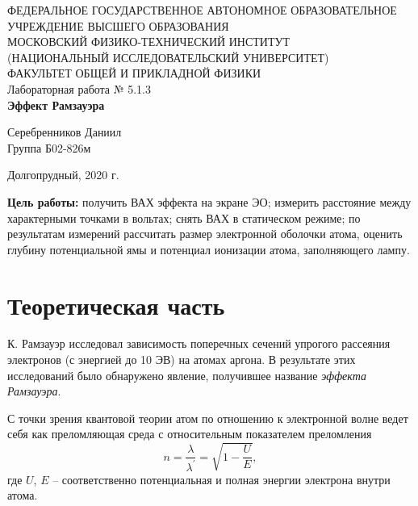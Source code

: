 \documentclass[a4paper,12pt]{article} %
\begin{document}
\begin{center}
	\footnotesize{ФЕДЕРАЛЬНОЕ ГОСУДАРСТВЕННОЕ АВТОНОМНОЕ ОБРАЗОВАТЕЛЬНОЕ 			УЧРЕЖДЕНИЕ ВЫСШЕГО ОБРАЗОВАНИЯ}\\
	\footnotesize{МОСКОВСКИЙ ФИЗИКО-ТЕХНИЧЕСКИЙ ИНСТИТУТ\\(НАЦИОНАЛЬНЫЙ 			ИССЛЕДОВАТЕЛЬСКИЙ УНИВЕРСИТЕТ)}\\
	\footnotesize{ФАКУЛЬТЕТ ОБЩЕЙ И ПРИКЛАДНОЙ ФИЗИКИ\\}
	\hfill \break
	\hfill\break
	\hfill\break
	\hfill \break
	\hfill \break
	\hfill \break
	\hfill \break
	\hfill \break
	\hfill \break
	\hfill \break
	\hfill \break
	\hfill \break
	\hfill \break
	\hfill \break
	\large{Лабораторная работа № 5.1.3 \\\textbf{Эффект Рамзауэра}}\\
	\hfill \break
	\hfill \break
	\hfill \break
	\begin{flushright}
		Серебренников Даниил\\
		Группа Б02-826м
	\end{flushright}
	\hfill \break
	\hfill \break
	\hfill \break
	\hfill \break
	\hfill \break
	\hfill \break
	\hfill \break
	\hfill \break
	\hfill \break
	\hfill \break
	\hfill \break
\end{center}
\begin{center}
	Долгопрудный, 2020 г.
\end{center}
\thispagestyle{empty}
\newpage
	\textbf{Цель работы:} получить ВАХ эффекта на экране ЭО; измерить расстояние между характерными точками в вольтах; снять ВАХ в статическом режиме; по результатам измерений рассчитать размер электронной оболочки атома, оценить глубину потенциальной ямы и потенциал ионизации атома, заполняющего лампу.

\section{Теоретическая часть}
	К. Рамзауэр исследовал зависимость поперечных сечений упрогого рассеяния электронов (с энергией до 10 ЭВ) на атомах аргона. В результате этих исследований было обнаружено явление, получившее название \textit{эффекта Рамзауэра}.
	
	С точки зрения квантовой теории атом по отношению к электронной волне ведет себя как преломляющая среда с относительным показателем преломления
	\begin{equation*}
		n = \frac{\lambda}{\lambda^\prime} = \sqrt{1-\frac{U}{E}},
	\end{equation*}
	где $U$, $E$ -- соответственно потенциальная и полная энергии электрона внутри атома.
	
\end{document}
